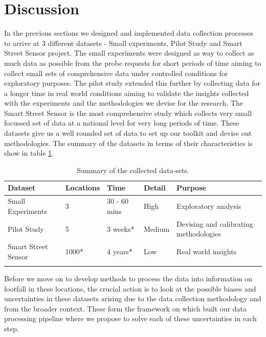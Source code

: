 \section{Discussion}
In the previous sections we designed and implemented data collection processes to arrive at 3 different datasets - Small experiments, Pilot Study and Smart Street Sensor project. 
The small experiments were designed as way to collect as much data as possible from the probe requests for short periods of time aiming to collect small sets of comprehensive data under controlled conditions for exploratory purposes.
The pilot study extended this further by collecting data for a longer time in real world conditions aiming to validate the insights collected with the experiments and the methodologies we devise for the research.
The Smart Street Sensor is the most comprehensive study which collects very small focussed set of data at a national level for very long periods of time.
These datasets give us a well rounded set of data to set up our toolkit and devise out methodologies.
The summary of the datasets in terms of their characteristics is show in table \ref{table:collection:discussion:summary}.

\begin{table}
  \footnotesize
  \begin{center}
    \begin{tabular}{llllp{3cm}}
      \toprule
      Dataset & Locations & Time & Detail & Purpose\\
      \midrule
      \addlinespace[0.1cm]
      Small Experiments & 3 & 30 - 60 mins & High & Exploratory analysis\\
      \addlinespace[0.2cm]
      Pilot Study & 5 & 3 weeks* & Medium & Devising and calibrating methodologies\\
      \addlinespace[0.2cm]
      Smart Street Sensor & 1000* & 4 years* & Low & Real world insights\\
      \addlinespace[0.1cm]
      \bottomrule
    \end{tabular}
  \end{center}
  \caption{Summary of the collected data-sets.}
  \label{table:collection:discussion:summary}
\end{table}

Before we move on to develop methods to process the data into information on footfall in these locations, the crucial action is to look at the possible biases and uncertainties in these datasets arising due to the data collection methodology and from the broader context.
These form the framework on which built our data processing pipeline where we propose to solve each of these uncertainties in each step.

